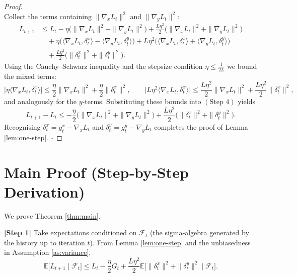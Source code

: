 \documentclass{article}
\newcommand{\E}{\mathbb{E}}
\begin{document}
\begin{proof}
\[\tag{Step 3}
\]
Collect the terms containing \(\|\nabla_{x}L_{t}\|^{2}\) and \(\|\nabla_{y}L_{t}\|^{2}\):
\[
\begin{aligned}
L_{t+1}&\le L_{t}
        -\eta\Big(\|\nabla_{x}L_{t}\|^{2}
                 +\|\nabla_{y}L_{t}\|^{2}\Big)
        +\frac{L\eta^{2}}{2}\Big(\|\nabla_{x}L_{t}\|^{2}
                 +\|\nabla_{y}L_{t}\|^{2}\Big) \\
      &\quad+\eta\Big(\langle\nabla_{x}L_{t},\delta^{x}_{t}\rangle
                 -\langle\nabla_{y}L_{t},\delta^{y}_{t}\rangle\Big)
        +L\eta^{2}\Big(\langle\nabla_{x}L_{t},\delta^{x}_{t}\rangle
                 +\langle\nabla_{y}L_{t},\delta^{y}_{t}\rangle\Big) \\
      &\quad+\frac{L\eta^{2}}{2}\Big(\|\delta^{x}_{t}\|^{2}
                 +\|\delta^{y}_{t}\|^{2}\Big).
\end{aligned}
\tag{Step 4}
\]
Using the Cauchy–Schwarz inequality and the stepsize condition \(\eta\le\frac{1}{2L}\) we bound the mixed terms:
\[
\big|\eta\langle\nabla_{x}L_{t},\delta^{x}_{t}\rangle\big|
\le \frac{\eta}{2}\|\nabla_{x}L_{t}\|^{2}
   +\frac{\eta}{2}\|\delta^{x}_{t}\|^{2},
\qquad
\big|L\eta^{2}\langle\nabla_{x}L_{t},\delta^{x}_{t}\rangle\big|
\le \frac{L\eta^{2}}{2}\|\nabla_{x}L_{t}\|^{2}
   +\frac{L\eta^{2}}{2}\|\delta^{x}_{t}\|^{2},
\]
and analogously for the \(y\)‑terms. Substituting these bounds into \((\text{Step 4})\) yields
\[
L_{t+1}-L_{t}
\le -\frac{\eta}{2}\Big(\|\nabla_{x}L_{t}\|^{2}
                     +\|\nabla_{y}L_{t}\|^{2}\Big)
   +\frac{L\eta^{2}}{2}\Big(\|\delta^{x}_{t}\|^{2}
                     +\|\delta^{y}_{t}\|^{2}\Big).
\tag{Step 5}
\]
Recognising \(\delta^{x}_{t}=g^{x}_{t}-\nabla_{x}L_{t}\) and \(\delta^{y}_{t}=g^{y}_{t}-\nabla_{y}L_{t}\) completes the proof of Lemma \ref{lem:one-step}. \(\square\)
\end{proof}

\newpage
\section*{Main Proof (Step‑by‑Step Derivation)}
We prove Theorem \ref{thm:main}.  

\noindent\textbf{[Step 1]} Take expectations conditioned on \(\mathcal{F}_{t}\) (the sigma‑algebra generated by the history up to iteration \(t\)). From Lemma \ref{lem:one-step} and the unbiasedness in Assumption \ref{as:variance},
\[
\E\!\big[L_{t+1}\mid\mathcal{F}_{t}\big]
\le L_{t}
      -\frac{\eta}{2}G_{t}
      +\frac{L\eta^{2}}{2}\E\!\big[\|\delta^{x}_{t}\|^{2}
                                 +\|\delta^{y}_{t}\|^{2}
                                 \mid\mathcal{F}_{t}\big].
\tag{P1}
\]
\end{document}
